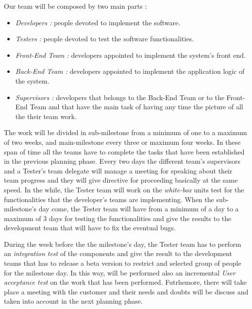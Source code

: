 Our team will be composed by two main parts :
\begin{itemize}
	\item \emph{Developers :} people devoted to implement the software.
	
	\item \emph{Testers :} people devoted to test the software functionalities.
	
	\item \emph{Front-End Team :} developers appointed to implement the system’s front end.
	
	
	\item \emph{Back-End Team :} developers appointed to implement the application logic of the system.
	
	\item \emph{Supervisors :} developers that belongs to the Back-End Team or to the Front-End Team and that have the main task of having any time the picture of all the their team work.
\end{itemize}

The work will be divided in sub-milestone from a minimum of one to a maximum of two weeks, and main-milestone every three or maximum four weeks. In these span of time all the teams have to complete the tasks that have been established in the previous planning phase. Every two days the different team's supervisors and a Tester’s team delegate will manage a meeting for speaking about their team progress and they will give directive for proceeding basically at the same speed. 
In the while, the Tester team will work on the \emph{white-box} units test for the functionalities that the developer’s teams are implementing.
When the sub-milestone’s day come, the Tester team will have from a minimum of a day to a maximum of 3 days for testing the functionalities and give the results to the development team that will have to fix the eventual bugs.

During the week before the the milestone’s day, the Tester team has to perform an \emph{integration test} of the components and give the result to the development teams that has to release a beta version to restrict and selected group of people for the milestone day. In this way, will be performed also an incremental \emph{User acceptance test} on the work that has been performed. Futrhemore, there will take place a meeting with the customer and their needs and doubts will be discuss and taken into account in the next planning phase.

